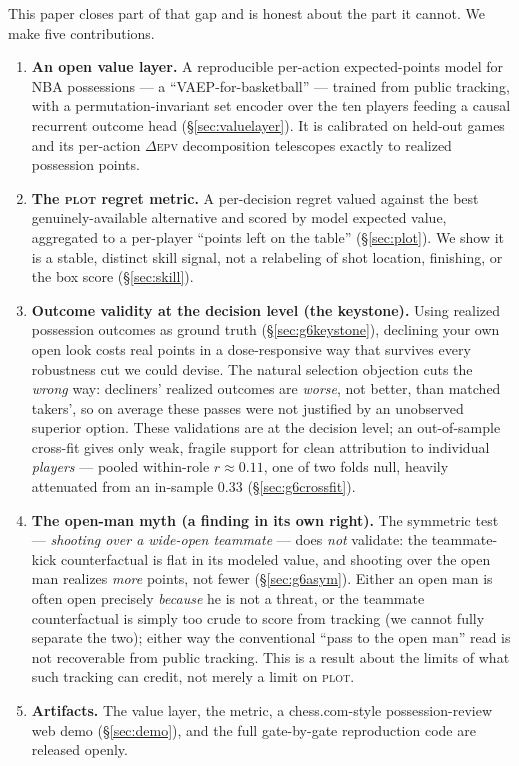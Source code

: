 \documentclass[11pt]{article}
\newcommand{\plot}{\textsc{plot}}
\newcommand{\epv}{\textsc{epv}}
\begin{document}
This paper closes part of that gap and is honest about the part it cannot. We make five contributions.

\begin{enumerate}
  \item \textbf{An open value layer.} A reproducible per-action expected-points model for NBA possessions
        --- a ``VAEP-for-basketball'' \citep{decroos2019actions} --- trained from public tracking, with a
        permutation-invariant set encoder over the ten players feeding a causal recurrent outcome head
        (\S\ref{sec:valuelayer}). It is calibrated on held-out games and its per-action $\Delta$\epv{}
        decomposition telescopes exactly to realized possession points.
  \item \textbf{The \plot{} regret metric.} A per-decision regret valued against the best
        genuinely-available alternative and scored by model expected value, aggregated to a per-player
        ``points left on the table'' (\S\ref{sec:plot}). We show it is a stable, distinct skill signal,
        not a relabeling of shot location, finishing, or the box score (\S\ref{sec:skill}).
  \item \textbf{Outcome validity at the decision level (the keystone).} Using realized possession
        outcomes as ground truth (\S\ref{sec:g6keystone}), declining your own open look costs real points
        in a dose-responsive way that survives every robustness cut we could devise. The natural
        selection objection cuts the \emph{wrong} way: decliners' realized outcomes are \emph{worse}, not
        better, than matched takers', so on average these passes were not justified by an unobserved
        superior option. These validations are at the decision level; an out-of-sample cross-fit gives
        only weak, fragile support for clean attribution to individual \emph{players} --- pooled
        within-role $r\!\approx\!0.11$, one of two folds null, heavily attenuated from an in-sample
        $0.33$ (\S\ref{sec:g6crossfit}).
  \item \textbf{The open-man myth (a finding in its own right).} The symmetric test ---
        \emph{shooting over a wide-open teammate} --- does \emph{not} validate: the teammate-kick
        counterfactual is flat in its modeled value, and shooting over the open man realizes \emph{more}
        points, not fewer (\S\ref{sec:g6asym}). Either an open man is often open precisely \emph{because}
        he is not a threat, or the teammate counterfactual is simply too crude to score from tracking
        (we cannot fully separate the two); either way the conventional ``pass to the open man'' read is
        not recoverable from public tracking. This is a result about the limits of what such tracking can
        credit, not merely a limit on \plot{}.
  \item \textbf{Artifacts.} The value layer, the metric, a chess.com-style possession-review web demo
        (\S\ref{sec:demo}), and the full gate-by-gate reproduction code are released openly.
\end{enumerate}
\end{document}
